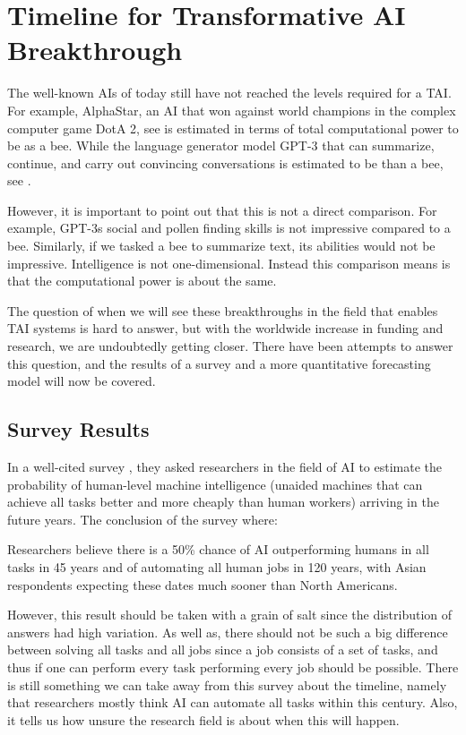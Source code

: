 \documentclass[12pt,A4]{report}
\theoremstyle{definition}
\begin{document}
\section{Timeline for Transformative AI Breakthrough}
The well-known AIs of today still have not reached the levels required for a TAI. For example, AlphaStar, an AI that won against world champions in the complex computer game DotA 2, see \citet{ALphaStar} is estimated in terms of total computational power to be  as a bee. While the language generator model GPT-3 that can summarize, continue, and carry out convincing conversations is estimated to be  than a bee, see \citet{Ajeya}.

However, it is important to point out that this is not a direct comparison. For example, GPT-3s social and pollen finding skills is not impressive compared to a bee. Similarly, if we tasked a bee to summarize text, its abilities would not be impressive. Intelligence is not one-dimensional. Instead this comparison means is that the computational power is about the same. 

The question of when we will see these breakthroughs in the field that enables TAI systems is hard to answer, but with the worldwide increase in funding and research, we are undoubtedly getting closer. There have been attempts to answer this question, and the results of a survey and a more quantitative forecasting model will now be covered. 

\subsection{Survey Results}
In a well-cited survey \citet{Grace}, they asked researchers in the field of AI to estimate the probability of human-level machine intelligence (unaided machines that can achieve all tasks better and more cheaply than human workers) arriving in the future years. The conclusion of the survey where:
\begin{displayquote}
Researchers believe there is a 50\% chance of AI outperforming humans in all tasks in 45 years and of automating all human jobs in 120 years, with Asian respondents expecting these dates much sooner than North Americans.
\end{displayquote}
However, this result should be taken with a grain of salt since the distribution of answers had high variation. As well as, there should not be such a big difference between solving all tasks and all jobs since a job consists of a set of tasks, and thus if one can perform every task performing every job should be possible. There is still something we can take away from this survey about the timeline, namely that researchers mostly think AI can automate all tasks within this century. Also, it tells us how unsure the research field is about when this will happen. 
\end{document}
